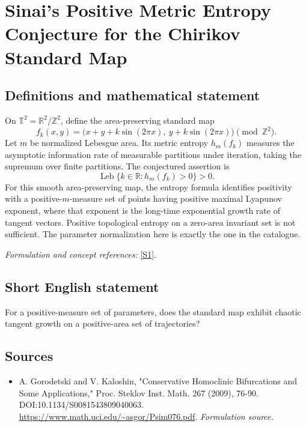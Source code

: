 \documentclass[11pt]{article}
\begin{document}
\section*{\texorpdfstring{Sinai's Positive Metric Entropy Conjecture for the Chirikov Standard Map}{Sinai's Positive Metric Entropy Conjecture for the Chirikov Standard Map}}\label{332}
\subsection{Definitions and mathematical statement}
On $\mathbb T^2={\mathbb{R}}^2/{\mathbb{Z}}^2$, define the area-preserving standard map
\[
 f_k(x,y)=\bigl(x+y+k\sin(2\pi x),\ y+k\sin(2\pi x)\bigr)\pmod{{\mathbb{Z}}^2}.
\]
Let $m$ be normalized Lebesgue area. Its metric entropy $h_m(f_k)$ measures the asymptotic information rate of measurable partitions under iteration, taking the supremum over finite partitions. The conjectured assertion is
\[
 \operatorname{Leb}\{k\in{\mathbb{R}}:h_m(f_k)>0\}>0.
\]
For this smooth area-preserving map, the entropy formula identifies positivity with a positive-$m$-measure set of points having positive maximal Lyapunov exponent, where that exponent is the long-time exponential growth rate of tangent vectors. Positive topological entropy on a zero-area invariant set is not sufficient. The parameter normalization here is exactly the one in the catalogue.
\par\smallskip\textit{Formulation and concept references:} \href{https://www.math.uci.edu/~asgor/Psim076.pdf}{[S1]}.

\subsection{Short English statement}
For a positive-measure set of parameters, does the standard map exhibit chaotic tangent growth on a positive-area set of trajectories?
\subsection{Sources}
\begin{itemize}
\item[S1]A. Gorodetski and V. Kaloshin, "Conservative Homoclinic Bifurcations and Some Applications," Proc. Steklov Inst. Math. 267 (2009), 76-90. DOI:10.1134/S0081543809040063.
\url{https://www.math.uci.edu/~asgor/Psim076.pdf}.
\textit{Formulation source.}
\end{itemize}
\end{document}

